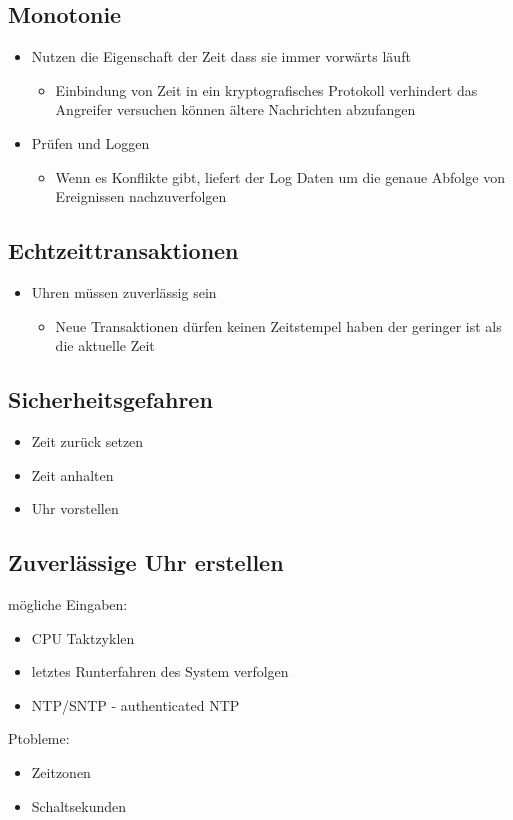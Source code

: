 \documentclass{article} %
\begin{document}
\subsection{Monotonie}
\begin{itemize}
	\item Nutzen die Eigenschaft der Zeit dass sie immer vorwärts läuft
    
    \begin{itemize}
        \item Einbindung von Zeit in ein kryptografisches Protokoll verhindert das Angreifer versuchen können ältere Nachrichten abzufangen
    \end{itemize}
    \item Prüfen und Loggen
    
    \begin{itemize}
        \item Wenn es Konflikte gibt, liefert der Log Daten um die genaue Abfolge von Ereignissen nachzuverfolgen
    \end{itemize}
\end{itemize}
\subsection{Echtzeittransaktionen}
\begin{itemize}
	\item Uhren müssen zuverlässig sein
    
    \begin{itemize}
        \item Neue Transaktionen dürfen keinen Zeitstempel haben der geringer ist als die aktuelle Zeit
    \end{itemize}
\end{itemize}
\subsection{Sicherheitsgefahren}
\begin{itemize}
	\item Zeit zurück setzen
    \item Zeit anhalten
    \item Uhr vorstellen
\end{itemize}
\subsection{Zuverlässige Uhr erstellen}
mögliche Eingaben:
\begin{itemize}
	\item CPU Taktzyklen
    \item letztes Runterfahren des System verfolgen
    \item NTP/SNTP - authenticated NTP
\end{itemize}
Ptobleme:
\begin{itemize}
	\item Zeitzonen
    \item Schaltsekunden
\end{itemize}
\end{document}
